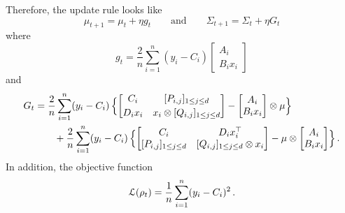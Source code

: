 \documentclass{custom}
\begin{document}
Therefore, the update rule looks like
\[
\mu_{t+1}=\mu_{t}+\eta g_{t}\qquad\text{and}\qquad\Sigma_{t+1}=\Sigma_{t}+\eta G_{t}
\]
where
\[
g_{t}=\frac{2}{n}\sum_{i=1}^{n}(y_{i}-C_{i})\begin{bmatrix}
A_{i}\\
B_{i}x_{i}
\end{bmatrix}
\]
and
\begin{align*}
G_{t} & =\frac{2}{n}\sum_{i=1}^{n}(y_{i}-C_{i})\,\Bigl\{ \begin{bmatrix}
C_{i} & [P_{i,j}]_{1\leq j\leq d}\\[0.25em]
D_{i}x_{i} & x_{i}\otimes[Q_{i,j}]_{1\leq j\leq d}
\end{bmatrix}-\begin{bmatrix}
A_{i}\\
B_{i}x_{i}
\end{bmatrix} \otimes\mu\Bigr\} \\
 & \qquad{} +\frac{2}{n}\sum_{i=1}^{n}(y_{i}-C_{i})\,\Bigl\{ \begin{bmatrix}
C_{i} & D_{i}x_{i}^{\top}\\
[P_{i,j}]_{1\leq j\leq d} & [Q_{i,j}]_{1\leq j\leq d}\otimes x_{i}
\end{bmatrix}-\mu\otimes \begin{bmatrix}
A_{i}\\
B_{i}x_{i}
\end{bmatrix}\Bigr\}\,.
\end{align*}
In addition, the objective function
\[
\EuScript{L}(\rho_{t})=\frac{1}{n}\sum_{i=1}^{n}(y_{i} - C_i)^{2}\,.
\]
\end{document}
